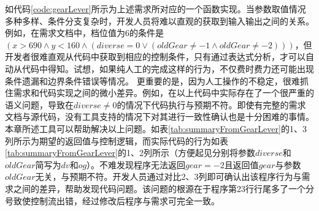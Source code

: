 如代码\ref{code:gearLever}所示为上述需求所对应的一个函数实现。当参数取值情况多种多样、条件分支复杂时，开发人员将难以直观的获取到输入输出之间的关系。例如，在需求文档中，档位值为6的条件是$  (x > 690 ∧ y < 160 ∧ (diverse = 0 ∨ (oldGear ≠ -1 ∧ oldGear ≠ -2))) $，但开发者很难直观从代码中获取到相应的控制条件，只有通过表达式分析，才可以自动从代码中得知。试想，如果纯人工的完成这样的行为，不仅费时费力还可能出现条件遗漏和边界条件错误等情况。
更重要的是，因为人工操作的不稳定，很难抓住需求和代码实现之间的微小差异。例如，在以上代码中实际存在了一个很严重的语义问题，导致在$ diverse ≠ 0 $的情况下代码执行与预期不符。即使有完整的需求文档与源代码，没有工具支持的情况下对其进行一致性确认也是十分困难的事情。
本章所述工具可以帮助解决以上问题。如表\ref{tab:summaryFromGearLever}的1、3列所示为期望的返回值与控制逻辑，而实际代码的行为如表\ref{tab:summaryFromGearLever}的1、2列所示（方便起见分别将参数$ diverse $和$ oldGear $简写为$ dv $和$ og $）。不难发现程序无法返回$ gear = -2 $且返回值$ gear $与参数$ oldGear $无关，与预期不符。开发人员通过对比2、3列即可确认出该程序行为与需求之间的差异，帮助发现代码问题。该问题的根源在于程序第23行行尾多了一个分号致使控制流出错，经过修改后程序与需求可完全一致。

